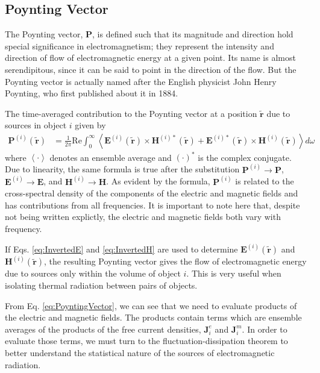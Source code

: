 \subsection{Poynting Vector}
%
The Poynting vector, $\boldsymbol{P}$, is defined such that its magnitude and direction hold special significance in electromagnetism; they represent the intensity and direction of flow of electromagnetic energy at a given point. Its name is almost serendipitous, since it can be said to point in the direction of the flow. But the Poynting vector is actually named after the English physicist John Henry Poynting, who first published about it in 1884.\cite{Poynting1884}

The time-averaged contribution to the Poynting vector at a position $\widetilde{\boldsymbol{r}}$ due to sources in object $i$ given by
%
\begin{align}
\boldsymbol{P}^{(i)}(\boldsymbol{\widetilde{r}}) &= \frac{1}{2\pi} \mathrm{Re} \int_{0}^{\infty} \left< \boldsymbol{E}^{(i)}(\boldsymbol{\widetilde{r}}) \times \boldsymbol{H}^{(i)*}(\boldsymbol{\widetilde{r}}) + \boldsymbol{E}^{(i)*}(\boldsymbol{\widetilde{r}}) \times \boldsymbol{H}^{(i)}(\boldsymbol{\widetilde{r}}) \right> d\omega \label{eq:PoyntingVector}
\end{align}
%
where $\left< \cdot \right>$ denotes an ensemble average and  $\left(\cdot\right)^{*}$ is the complex conjugate. Due to linearity, the same formula is true after the substitution $\boldsymbol{P}^{(i)} \rightarrow \boldsymbol{P}$, $\boldsymbol{E}^{(i)} \rightarrow \boldsymbol{E}$, and $\boldsymbol{H}^{(i)} \rightarrow \boldsymbol{H}$. As evident by the formula, $\boldsymbol{P}^{(i)}$ is related to the cross-spectral density of the components of the electric and magnetic fields and has contributions from all frequencies. It is important to note here that, despite not being written explictly, the electric and magnetic fields both vary with frequency.

If Eqs. \ref{eq:InvertedE} and \ref{eq:InvertedH} are used to determine $\boldsymbol{E}^{(i)}(\boldsymbol{\widetilde{r}})$ and $\boldsymbol{H}^{(i)}(\boldsymbol{\widetilde{r}})$, the resulting Poynting vector gives the flow of electromagnetic energy due to sources only within the volume of object $i$. This is very useful when isolating thermal radiation between pairs of objects.

From Eq. \ref{eq:PoyntingVector}, we can see that we need to evaluate products of the electric and magnetic fields. The products contain terms which are ensemble averages of the products of the free current densities, $\boldsymbol{J}_{i}^{e}$ and $\boldsymbol{J}_{i}^{m}$. In order to evaluate those terms, we must turn to the fluctuation-dissipation theorem to better understand the statistical nature of the sources of electromagnetic radiation.



